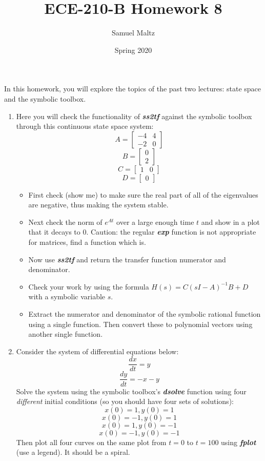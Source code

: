\documentclass[12pt]{article}
\title{ECE-210-B Homework 8}
\author{Samuel Maltz}
\date{Spring 2020}
\begin{document}
\noindent In this homework, you will explore the topics of the past two lectures: state space and the symbolic toolbox.
\begin{enumerate}
\item Here you will check the functionality of \textbf{\textit{ss2tf}} against the symbolic toolbox through this continuous state space system:
$$A = \begin{bmatrix}
-4 & 4 \\
-2 & 0\end{bmatrix}$$
$$B = \begin{bmatrix}
0 \\
2
\end{bmatrix}$$
$$C = \begin{bmatrix}
1 & 0
\end{bmatrix}$$
$$D = \begin{bmatrix}
0
\end{bmatrix}$$
\begin{itemize}
\item First check (show me) to make sure the real part of all of the eigenvalues are negative, thus making the system stable.
\item Next check the norm of $e^{At}$ over a large enough time $t$ and show in a plot that it decays to 0. Caution: the regular \textbf{\textit{exp}} function is not appropriate for matrices, find a function which is.
\item Now use \textbf{\textit{ss2tf}} and return the transfer function numerator and denominator.
\item Check your work by using the formula $H(s) = C(sI-A)^{-1}B+D$ with a symbolic variable $s$.
\item Extract the numerator and denominator of the symbolic rational function using a single function. Then convert these to polynomial vectors using another single function.
\end{itemize}

\item Consider the system of differential equations below:
$$\frac{dx}{dt} = y$$
$$\frac{dy}{dt} = -x-y$$
Solve the system using the symbolic toolbox's \textbf{\textit{dsolve}} function using four \textit{different} initial conditions (so you should have four sets of solutions):
$$x(0)=1,y(0)=1$$
$$x(0)=-1,y(0)=1$$
$$x(0)=1,y(0)=-1$$
$$x(0)=-1,y(0)=-1$$
Then plot all four curves on the same plot from $t=0$ to $t=100$ using \textbf{\textit{fplot}} (use a legend). It should be a spiral.


\end{enumerate}
\end{document}
